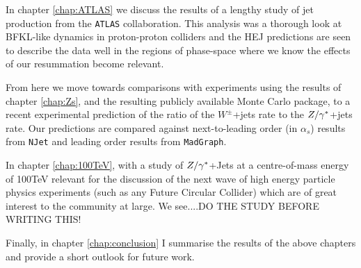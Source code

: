 	In chapter \ref{chap:ATLAS} we discuss the results of a lengthy study of jet production from the \texttt{ATLAS} collaboration.  This analysis was a thorough
	look at BFKL-like dynamics in proton-proton colliders and the HEJ predictions are seen to describe the data well in the regions of phase-space where
	we know the effects of our resummation become relevant.

	From here we move towards comparisons with experiments using the results of chapter \ref{chap:Zs}, and the resulting publicly available Monte Carlo
	package, to a recent experimental prediction of the ratio of the $W^\pm$+jets rate to the ${Z/\gamma^*}$+jets rate.  Our predictions are compared against
	next-to-leading order (in $\alpha_s$) results from \texttt{NJet} and leading order results from \texttt{MadGraph}.

	In chapter \ref{chap:100TeV}, with a study of ${Z/\gamma^*}$+Jets at a centre-of-mass energy of 100TeV relevant for the discussion of
	the next wave of high energy particle physics experiments (such as any Future Circular Collider) which are of great interest to the community at large.  We see....DO THE STUDY BEFORE
	WRITING THIS!

	Finally, in chapter \ref{chap:conclusion} I summarise the results of the above chapters and provide a short outlook for future work.

